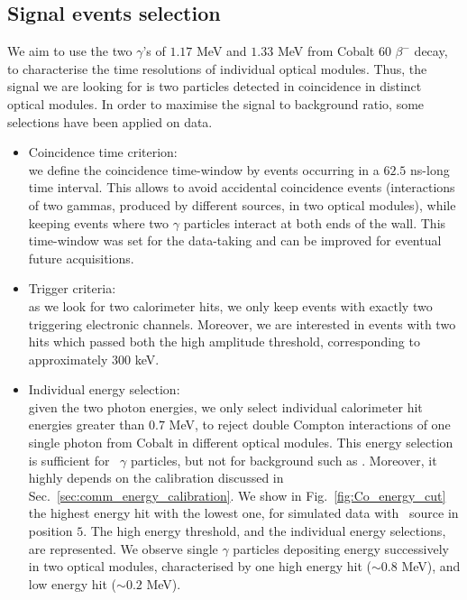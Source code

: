 \subsection{Signal events selection}
\label{subsec:Co_datacut}

We aim to use the two $\gamma$'s of $1.17$ MeV and $1.33$ MeV from Cobalt $60$ $\beta^{-}$ decay, to characterise the time resolutions of individual optical modules.
Thus, the signal we are looking for is two particles detected in coincidence in distinct optical modules.
In order to maximise the signal to background ratio, some selections have been applied on data.
\begin{itemize}
\item Coincidence time criterion:\\ we define the coincidence time-window by events occurring in a $62.5$ ns-long time interval.
  This allows to avoid accidental coincidence events (interactions of two gammas, produced by different sources, in two optical modules), while keeping events where two $\gamma$ particles interact at both ends of the wall.
  This time-window was set for the data-taking and can be improved for eventual future acquisitions.
\item Trigger criteria:\\ as we look for two calorimeter hits, we only keep events with exactly two triggering electronic channels.
  Moreover, we are interested in events with two hits which passed both the high amplitude threshold, corresponding to approximately $300$ keV.
\item Individual energy selection:\\ given the two photon energies, we only select individual calorimeter hit energies greater than $0.7$ MeV, to reject double Compton interactions of one single photon from Cobalt in different optical modules.
  This energy selection is sufficient for \Co\ $\gamma$ particles, but not for background such as \Tl.
  Moreover, it highly depends on the calibration discussed in Sec.~\ref{sec:comm_energy_calibration}.
  We show in Fig.~\ref{fig:Co_energy_cut} the highest energy hit with the lowest one, for simulated data with \Co\ source in position $5$.
  The high energy threshold, and the individual energy selections, are represented.
  We observe single $\gamma$ particles depositing energy successively in two optical modules, characterised by one high energy hit ($\sim 0.8$ MeV), and low energy hit ($\sim 0.2$ MeV).
  \begin{figure}[h]
  \centering

\end{figure}
\end{itemize}
